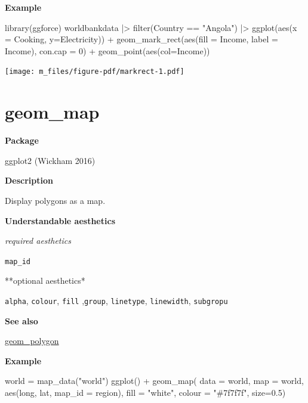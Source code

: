 \documentclass[
  letterpaper,
  DIV=11,
  numbers=noendperiod]{scrreprt}
\newenvironment{Shaded}{\begin{snugshade}}{\end{snugshade}}
\newcommand{\AttributeTok}[1]{\textcolor[rgb]{0.40,0.45,0.13}{#1}}
\newcommand{\DecValTok}[1]{\textcolor[rgb]{0.68,0.00,0.00}{#1}}
\newcommand{\FloatTok}[1]{\textcolor[rgb]{0.68,0.00,0.00}{#1}}
\newcommand{\FunctionTok}[1]{\textcolor[rgb]{0.28,0.35,0.67}{#1}}
\newcommand{\NormalTok}[1]{\textcolor[rgb]{0.00,0.23,0.31}{#1}}
\newcommand{\OtherTok}[1]{\textcolor[rgb]{0.00,0.23,0.31}{#1}}
\newcommand{\SpecialCharTok}[1]{\textcolor[rgb]{0.37,0.37,0.37}{#1}}
\newcommand{\StringTok}[1]{\textcolor[rgb]{0.13,0.47,0.30}{#1}}
\begin{document}
\textbf{Example}

\begin{Shaded}
\begin{Highlighting}[]
\FunctionTok{library}\NormalTok{(ggforce)}
\NormalTok{worldbankdata }\SpecialCharTok{|\textgreater{}}
  \FunctionTok{filter}\NormalTok{(Country }\SpecialCharTok{==} \StringTok{"Angola"}\NormalTok{) }\SpecialCharTok{|\textgreater{}}
  \FunctionTok{ggplot}\NormalTok{(}\FunctionTok{aes}\NormalTok{(}\AttributeTok{x =}\NormalTok{ Cooking, }\AttributeTok{y=}\NormalTok{Electricity)) }\SpecialCharTok{+}
  \FunctionTok{geom\_mark\_rect}\NormalTok{(}\FunctionTok{aes}\NormalTok{(}\AttributeTok{fill =}\NormalTok{ Income, }\AttributeTok{label =}\NormalTok{ Income),}
                   \AttributeTok{con.cap =} \DecValTok{0}\NormalTok{) }\SpecialCharTok{+}
  \FunctionTok{geom\_point}\NormalTok{(}\FunctionTok{aes}\NormalTok{(}\AttributeTok{col=}\NormalTok{Income))}
\end{Highlighting}
\end{Shaded}

\texttt{[image: m\_files/figure-pdf/markrect-1.pdf]}

\section{geom\_map}\label{map}

\textbf{Package}

ggplot2 (Wickham 2016)

\textbf{Description}

Display polygons as a map.

\textbf{Understandable aesthetics}

\emph{required aesthetics}

\texttt{map\_id}

**optional aesthetics*

\texttt{alpha}, \texttt{colour}, \texttt{fill} ,\texttt{group},
\texttt{linetype}, \texttt{linewidth}, \texttt{subgropu}

\textbf{See also}

\hyperref[polygon]{geom\_polygon}

\textbf{Example}

\begin{Shaded}
\begin{Highlighting}[]
\NormalTok{world }\OtherTok{=} \FunctionTok{map\_data}\NormalTok{(}\StringTok{"world"}\NormalTok{)}
\FunctionTok{ggplot}\NormalTok{() }\SpecialCharTok{+}
  \FunctionTok{geom\_map}\NormalTok{(}
    \AttributeTok{data =}\NormalTok{ world, }\AttributeTok{map =}\NormalTok{ world,}
    \FunctionTok{aes}\NormalTok{(long, lat, }\AttributeTok{map\_id =}\NormalTok{ region),}
    \AttributeTok{fill =} \StringTok{"white"}\NormalTok{, }\AttributeTok{colour =} \StringTok{"\#7f7f7f"}\NormalTok{, }\AttributeTok{size=}\FloatTok{0.5}\NormalTok{) }
\end{Highlighting}
\end{Shaded}
\end{document}
